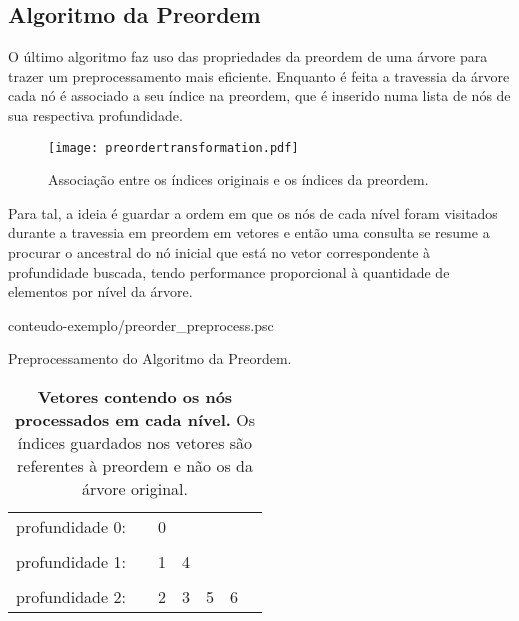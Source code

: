 \subsection{Algoritmo da Preordem}
O último algoritmo faz uso das propriedades da preordem de uma árvore para trazer um
preprocessamento mais eficiente. Enquanto é feita a travessia da árvore cada nó é associado a
seu índice na preordem, que é inserido numa lista de nós de sua respectiva profundidade.

\begin{figure}
  \centering
  \texttt{[image: preordertransformation.pdf]}
  \caption{Associação entre os índices originais e os índices da preordem.}
  \label{fig:preordertransformation}
\end{figure}

Para tal, a ideia é guardar a ordem em que os nós de cada nível
foram visitados durante a travessia em preordem em vetores e então uma consulta se
resume a procurar o ancestral do nó inicial que está no vetor correspondente à
profundidade buscada, tendo performance proporcional à quantidade de elementos por
nível da árvore.

\begin{program}[h!]
  
    {conteudo-exemplo/preorder_preprocess.psc}
    
    \caption{Preprocessamento do Algoritmo da Preordem.\label{prog:preorderproc}}
  \end{program}

\begin{table}[h!]
  \begin{tabular}{lllllll}
  \cline{3-3}
  profundidade 0: & \multicolumn{1}{l|}{} & \multicolumn{1}{l|}{0} &                        &                        &                        \\ \cline{3-3}
                  &                       &                        &                        &                        &                        \\ \cline{3-4}
  profundidade 1: & \multicolumn{1}{l|}{} & \multicolumn{1}{l|}{1} & \multicolumn{1}{l|}{4} &                        &                        \\ \cline{3-4}
                  &                       &                        &                        &                        &                        \\ \cline{3-6} 
  profundidade 2: & \multicolumn{1}{l|}{} & \multicolumn{1}{l|}{2} & \multicolumn{1}{l|}{3} & \multicolumn{1}{l|}{5} & \multicolumn{1}{l|}{6} \\ \cline{3-6} 
  \end{tabular}
  \caption[Vetores contendo os nós processados em cada nível.]
  {\textbf{Vetores contendo os nós processados em cada nível.} Os índices guardados nos
  vetores são referentes à preordem e não os da árvore original.}
\end{table}


